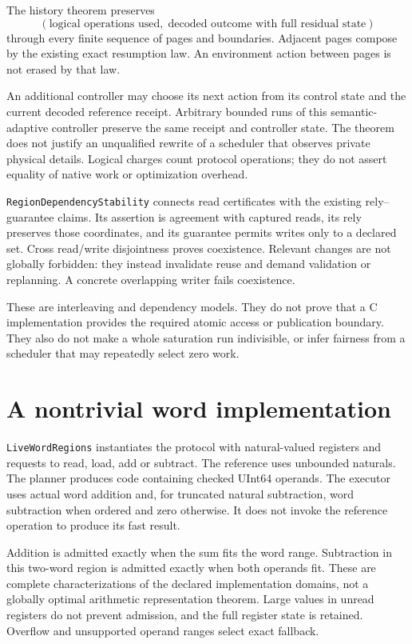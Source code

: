 \documentclass[11pt,a4paper]{article}
\newcommand{\code}[1]{\nolinkurl{#1}}
\begin{document}
The history theorem preserves
\[
  (\text{logical operations used},\;
       \text{decoded outcome with full residual state})
\]
through every finite sequence of pages and boundaries. Adjacent pages compose
by the existing exact resumption law. An environment action between pages
is not erased by that law.

An additional controller may choose its next action from its control state
and the current decoded reference receipt. Arbitrary bounded runs of this
semantic-adaptive controller preserve the same receipt and controller state.
The theorem does not justify an unqualified rewrite of a scheduler that
observes private physical details. Logical charges count protocol operations;
they do not assert equality of native work or optimization overhead.

\code{RegionDependencyStability} connects read certificates with the existing
rely--guarantee claims. Its assertion is agreement with captured reads, its
rely preserves those coordinates, and its guarantee permits writes only to a
declared set. Cross read/write disjointness proves coexistence. Relevant
changes are not globally forbidden: they instead invalidate reuse and demand
validation or replanning. A concrete overlapping writer fails coexistence.

These are interleaving and dependency models. They do not prove that a C
implementation provides the required atomic access or publication boundary.
They also do not make a whole saturation run indivisible, or infer fairness
from a scheduler that may repeatedly select zero work.

\section{A nontrivial word implementation}

\code{LiveWordRegions} instantiates the protocol with natural-valued registers
and requests to read, load, add or subtract. The reference uses unbounded
naturals. The planner produces code containing checked UInt64 operands.
The executor uses actual word addition and, for truncated natural subtraction,
word subtraction when ordered and zero otherwise. It does not invoke the
reference operation to produce its fast result.

Addition is admitted exactly when the sum fits the word range. Subtraction
in this two-word region is admitted exactly when both operands fit.
These are complete characterizations of the declared implementation domains,
not a globally optimal arithmetic representation theorem. Large values in
unread registers do not prevent admission, and the full register state is
retained. Overflow and unsupported operand ranges select exact fallback.
\end{document}
